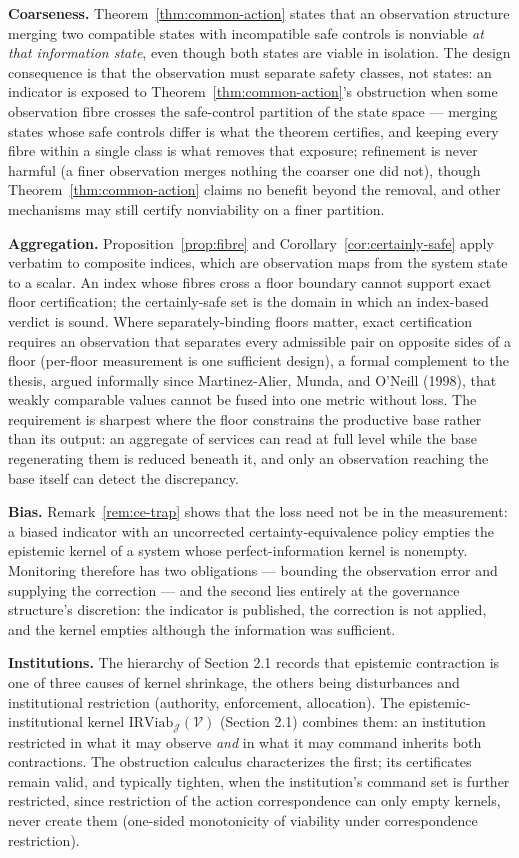 \documentclass[10pt,twocolumn]{article}
\theoremstyle{definition}
\begin{document}
\textbf{Coarseness.} Theorem~\ref{thm:common-action} states that an observation structure
merging two compatible states with incompatible safe controls is
nonviable \emph{at that information state}, even though both states are
viable in isolation. The design consequence is that the observation must
separate safety classes, not states: an indicator is exposed to Theorem~\ref{thm:common-action}'s obstruction when some observation fibre crosses the safe-control
partition of the state space --- merging states whose safe controls differ is what the theorem certifies, and keeping every fibre within a single class is what removes that exposure; refinement is never harmful (a finer observation merges nothing the coarser one did not), though Theorem~\ref{thm:common-action}
claims no benefit beyond the removal, and other mechanisms may still
certify nonviability on a finer partition.

\textbf{Aggregation.} Proposition~\ref{prop:fibre} and Corollary~\ref{cor:certainly-safe} apply verbatim to
composite indices, which are observation maps from the system state to a
scalar. An index whose fibres cross a floor boundary cannot support
exact floor certification; the certainly-safe set is the domain in which an index-based verdict is sound. Where separately-binding floors matter, exact
certification requires an observation that separates every admissible
pair on opposite sides of a floor (per-floor measurement is one sufficient design), a formal complement to the thesis, argued informally since Martinez-Alier, Munda, and O'Neill (1998), that weakly comparable
values cannot be fused into one metric without loss. The requirement is
sharpest where the floor constrains the productive base rather than its
output: an aggregate of services can read at full level while the base
regenerating them is reduced beneath it, and only an observation
reaching the base itself can detect the discrepancy.

\textbf{Bias.} Remark~\ref{rem:ce-trap} shows that the loss need not be in the
measurement: a biased indicator with an uncorrected
certainty-equivalence policy empties the epistemic kernel of a system
whose perfect-information kernel is nonempty. Monitoring therefore has
two obligations --- bounding the observation error and supplying the
correction --- and the second lies entirely at the governance structure's discretion: the indicator is published, the correction is not applied,
and the kernel empties although the information was sufficient.

\textbf{Institutions.} The hierarchy of Section 2.1 records that
epistemic contraction is one of three causes of kernel shrinkage, the
others being disturbances and institutional restriction (authority,
enforcement, allocation). The epistemic-institutional kernel \(\mathrm{IRViab}_{\mathcal{J}}(\mathcal{V})\) (Section 2.1) combines them: an institution restricted in what it
may observe \emph{and} in what it may command inherits both
contractions. The obstruction calculus characterizes the first; its certificates remain valid, and typically tighten, when the institution's command set is further restricted, since restriction of
the action correspondence can only empty kernels, never create them
(one-sided monotonicity of viability under correspondence restriction).
\end{document}

